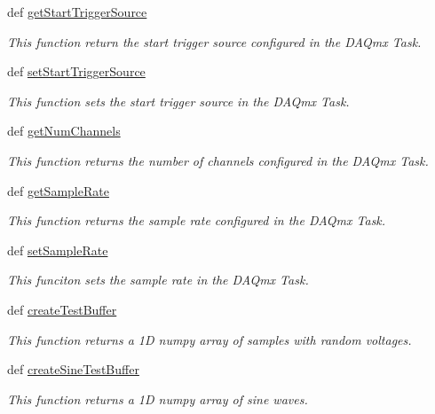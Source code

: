 \begin{DoxyCompactItemize}
def \hyperlink{class_analog_output_1_1_analog_output_adcb04886fe1b222cbbf4ec8ab3c01153}{get\-Start\-Trigger\-Source}
\begin{DoxyCompactList}\small\item\em This function return the start trigger source configured in the D\-A\-Qmx Task. \end{DoxyCompactList}\item 
def \hyperlink{class_analog_output_1_1_analog_output_a9dacc2895d366a28732d480fd632ad80}{set\-Start\-Trigger\-Source}
\begin{DoxyCompactList}\small\item\em This function sets the start trigger source in the D\-A\-Qmx Task. \end{DoxyCompactList}\item 
def \hyperlink{class_analog_output_1_1_analog_output_af833d97ef4cb7cc53ac7eba7e69eb1ad}{get\-Num\-Channels}
\begin{DoxyCompactList}\small\item\em This function returns the number of channels configured in the D\-A\-Qmx Task. \end{DoxyCompactList}\item 
def \hyperlink{class_analog_output_1_1_analog_output_a19e38c3a77a064c52db37c48099684ce}{get\-Sample\-Rate}
\begin{DoxyCompactList}\small\item\em This function returns the sample rate configured in the D\-A\-Qmx Task. \end{DoxyCompactList}\item 
def \hyperlink{class_analog_output_1_1_analog_output_a20285eba22830949eb40ce15270655dd}{set\-Sample\-Rate}
\begin{DoxyCompactList}\small\item\em This funciton sets the sample rate in the D\-A\-Qmx Task. \end{DoxyCompactList}\item 
def \hyperlink{class_analog_output_1_1_analog_output_ae3fae0e7f57f4576cb2b3746c0873f50}{create\-Test\-Buffer}
\begin{DoxyCompactList}\small\item\em This function returns a 1\-D numpy array of samples with random voltages. \end{DoxyCompactList}\item 
def \hyperlink{class_analog_output_1_1_analog_output_aacf14b2f94fad32a659d1bd04b88ffd6}{create\-Sine\-Test\-Buffer}
\begin{DoxyCompactList}\small\item\em This function returns a 1\-D numpy array of sine waves. \end{DoxyCompactList}\item 

\end{DoxyCompactItemize}

